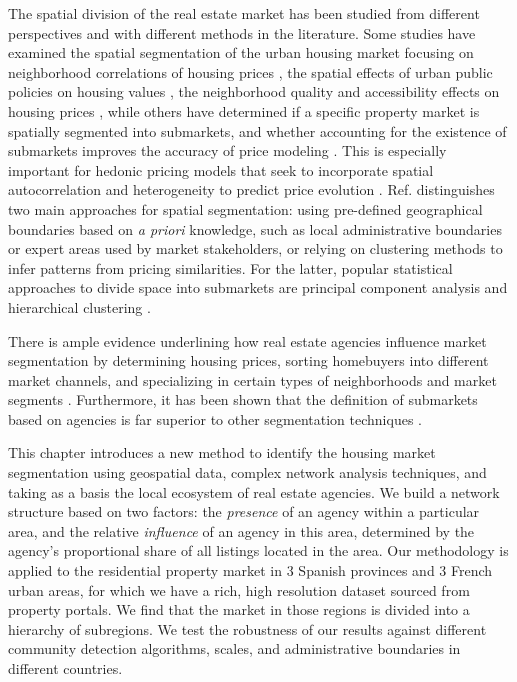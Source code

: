 The spatial division of the real estate market has been studied from different perspectives and with different methods in the literature. Some studies have examined the spatial segmentation of the urban housing market focusing on neighborhood correlations of housing prices \cite{palm1978spatial}, the spatial effects of urban public policies on housing values \cite{baumont2009spatial}, the neighborhood quality and accessibility effects on housing prices \cite{dubin1992spatial}, while others have determined if a specific property market is spatially segmented into submarkets, and whether accounting for the existence of submarkets improves the accuracy of price modeling \cite{keskin2017defining,usman2021priori}. This is especially important for hedonic pricing models that seek to incorporate spatial autocorrelation and heterogeneity to predict price evolution \cite{usman2021priori,paez2009recent,bitter2007incorporating, case2004modeling}. Ref. \cite{hu2022NovelApproach} distinguishes two main approaches for spatial segmentation: using pre-defined geographical boundaries based on \textit{a priori} knowledge, such as local administrative boundaries or expert areas used by market stakeholders, or relying on clustering methods to infer patterns from pricing similarities. For the latter, popular statistical approaches to divide space into submarkets are principal component analysis and hierarchical clustering \cite{goodman1998housing,bourassa1999defining,bourassa2003housing}.

There is ample evidence underlining how real estate agencies influence market segmentation by determining housing prices, sorting homebuyers into different market channels, and specializing in certain types of neighborhoods and market segments \cite{palm1976RealEstate,palm1978spatial,keskin2017defining,bonneval2017agents,besbris2017investigating}. Furthermore, it has been shown that the definition of submarkets based on agencies is far superior to other segmentation techniques \cite{leishman2013predictive}.

This chapter introduces a new method to identify the housing market segmentation using geospatial data, complex network analysis techniques, and taking as a basis the local ecosystem of real estate agencies. We build a network structure based on two factors:  the \textit{presence} of an agency within a particular area, and the relative \textit{influence} of an agency in this area, determined by the agency's proportional share of all listings located in the area. Our methodology is applied to the residential property market in 3 Spanish provinces and 3 French urban areas, for which we have a rich, high resolution dataset sourced from property portals. We find that the market in those regions is divided into a hierarchy of subregions. We test the robustness of our results against different community detection algorithms, scales, and administrative boundaries in different countries.


